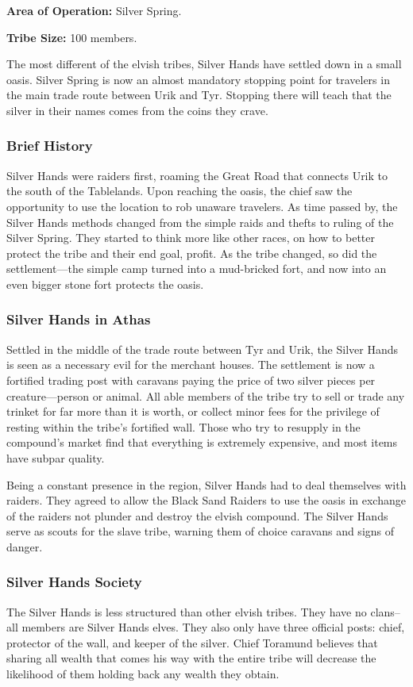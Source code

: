 \textbf{Area of Operation:} Silver Spring.

\textbf{Tribe Size:} 100 members.

The most different of the elvish tribes, Silver Hands have settled down in a small oasis. Silver Spring is now an almost mandatory stopping point for travelers in the main trade route between Urik and Tyr. Stopping there will teach that the silver in their names comes from the coins they crave.

\subsubsection{Brief History}
Silver Hands were raiders first, roaming the Great Road that connects Urik to the south of the Tablelands. Upon reaching the oasis, the chief saw the opportunity to use the location to rob unaware travelers. As time passed by, the Silver Hands methods changed from the simple raids and thefts to ruling of the Silver Spring. They started to think more like other races, on how to better protect the tribe and their end goal, profit. As the tribe changed, so did the settlement---the simple camp turned into a mud-bricked fort, and now into an even bigger stone fort protects the oasis.

\subsubsection{Silver Hands in Athas}
Settled in the middle of the trade route between Tyr and Urik, the Silver Hands is seen as a necessary evil for the merchant houses. The settlement is now a fortified trading post with  caravans paying the price of two silver pieces per creature---person or animal. All able members of the tribe try to sell or trade any trinket for far more than it is worth, or collect minor fees for the privilege of resting within the tribe's fortified wall. Those who try to resupply in the compound's market find that everything is extremely expensive, and most items have subpar quality.

Being a constant presence in the region, Silver Hands had to deal themselves with raiders. They agreed to allow the Black Sand Raiders to use the oasis in exchange of the raiders not plunder and destroy the elvish compound. The Silver Hands serve as scouts for the slave tribe, warning them of choice caravans and signs of danger.

\subsubsection{Silver Hands Society}
The Silver Hands is less structured than other elvish tribes. They have no clans--all members are Silver Hands elves. They also only have three official posts: chief, protector of the wall, and keeper of the silver. Chief Toramund believes that sharing all wealth that comes his way with the entire tribe will decrease the likelihood of them holding back any wealth they obtain.

